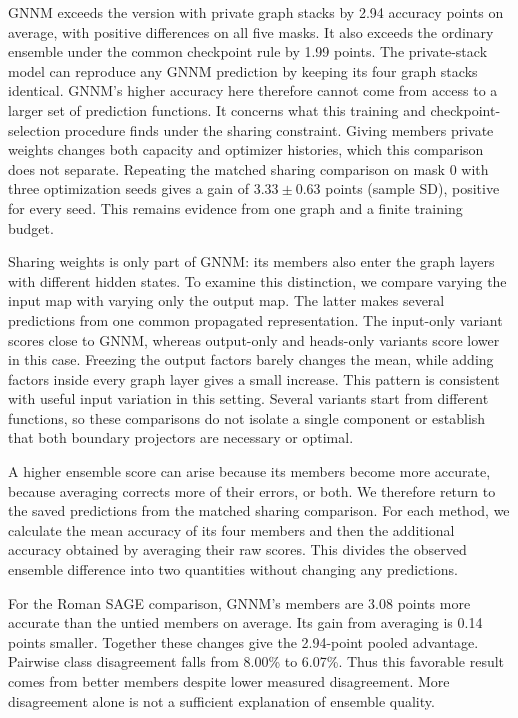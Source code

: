 \documentclass{article}
\begin{document}
GNNM exceeds the version with private graph stacks by 2.94 accuracy points on average, with positive differences on all five masks. It also exceeds the ordinary ensemble under the common checkpoint rule by 1.99 points. The private-stack model can reproduce any GNNM prediction by keeping its four graph stacks identical. GNNM's higher accuracy here therefore cannot come from access to a larger set of prediction functions. It concerns what this training and checkpoint-selection procedure finds under the sharing constraint. Giving members private weights changes both capacity and optimizer histories, which this comparison does not separate. Repeating the matched sharing comparison on mask 0 with three optimization seeds gives a gain of $3.33\pm0.63$ points (sample SD), positive for every seed. This remains evidence from one graph and a finite training budget.

Sharing weights is only part of GNNM: its members also enter the graph layers with different hidden states. To examine this distinction, we compare varying the input map with varying only the output map. The latter makes several predictions from one common propagated representation. The input-only variant scores close to GNNM, whereas output-only and heads-only variants score lower in this case. Freezing the output factors barely changes the mean, while adding factors inside every graph layer gives a small increase. This pattern is consistent with useful input variation in this setting. Several variants start from different functions, so these comparisons do not isolate a single component or establish that both boundary projectors are necessary or optimal.

A higher ensemble score can arise because its members become more accurate, because averaging corrects more of their errors, or both. We therefore return to the saved predictions from the matched sharing comparison. For each method, we calculate the mean accuracy of its four members and then the additional accuracy obtained by averaging their raw scores. This divides the observed ensemble difference into two quantities without changing any predictions.

For the Roman SAGE comparison, GNNM's members are 3.08 points more accurate than the untied members on average. Its gain from averaging is 0.14 points smaller. Together these changes give the 2.94-point pooled advantage. Pairwise class disagreement falls from 8.00\% to 6.07\%. Thus this favorable result comes from better members despite lower measured disagreement. More disagreement alone is not a sufficient explanation of ensemble quality.
\end{document}
